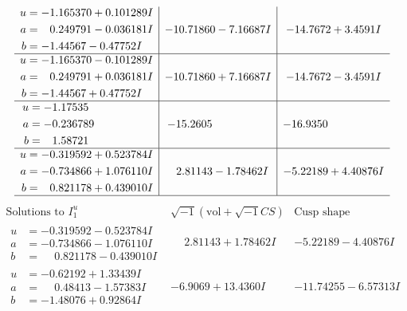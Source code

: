 \documentclass[1p]{elsarticle_modified}
\theoremstyle{definition}
\newcommand{\I}{\sqrt{-1}}
\begin{document}
$$\begin{array}{c|c|c}
\begin{aligned}
u &= -1.165370 + 0.101289 I \\
a &= \phantom{-}0.249791 - 0.036181 I \\
b &= -1.44567 - 0.47752 I\end{aligned}
 & -10.71860 - 7.16687 I & -14.7672 + 3.4591 I \\ \hline\begin{aligned}
u &= -1.165370 - 0.101289 I \\
a &= \phantom{-}0.249791 + 0.036181 I \\
b &= -1.44567 + 0.47752 I\end{aligned}
 & -10.71860 + 7.16687 I & -14.7672 - 3.4591 I \\ \hline\begin{aligned}
u &= -1.17535\phantom{ +0.000000I} \\
a &= -0.236789\phantom{ +0.000000I} \\
b &= \phantom{-}1.58721\phantom{ +0.000000I}\end{aligned}
 & -15.2605\phantom{ +0.000000I} & -16.9350\phantom{ +0.000000I} \\ \hline\begin{aligned}
u &= -0.319592 + 0.523784 I \\
a &= -0.734866 + 1.076110 I \\
b &= \phantom{-}0.821178 + 0.439010 I\end{aligned}
 & \phantom{-}2.81143 - 1.78462 I & -5.22189 + 4.40876 I\\
 \hline 
 \end{array}$$\newpage$$\begin{array}{c|c|c}  
\text{Solutions to }I^u_{1}& \I (\text{vol} + \sqrt{-1}CS) & \text{Cusp shape}\\
 \hline 
\begin{aligned}
u &= -0.319592 - 0.523784 I \\
a &= -0.734866 - 1.076110 I \\
b &= \phantom{-}0.821178 - 0.439010 I\end{aligned}
 & \phantom{-}2.81143 + 1.78462 I & -5.22189 - 4.40876 I \\ \hline\begin{aligned}
u &= -0.62192 + 1.33439 I \\
a &= \phantom{-}0.48413 - 1.57383 I \\
b &= -1.48076 + 0.92864 I\end{aligned}
 & -6.9069 + 13.4360 I & -11.74255 - 6.57313 I \\ \hline\begin{aligned}

\end{aligned}
\end{array}$$
\end{document}
